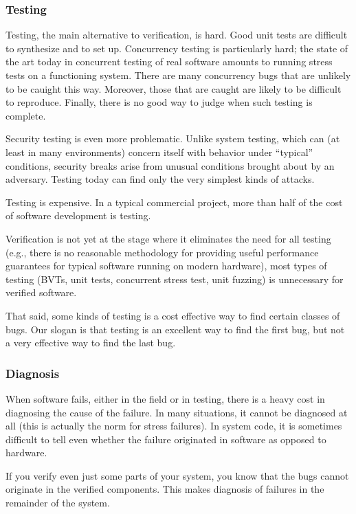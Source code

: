 \documentclass{report}
\begin{document}
\subsubsection{Testing}
Testing, the main alternative to verification, is hard. Good unit
tests are difficult to synthesize and to set up. Concurrency testing
is particularly hard; the state of the art today in concurrent testing
of real software amounts to running stress tests on a functioning
system. There are many concurrency bugs that are unlikely to be
cauight this way. Moreover, those that are caught are likely to be
difficult to reproduce. Finally, there is no good way to judge when
such testing is complete.

Security testing is even more problematic. Unlike system testing,
which can (at least in many environments) concern itself with behavior
under ``typical'' conditions, security breaks arise from unusual
conditions brought about by an adversary. Testing today can find
only the very simplest kinds of attacks. 

Testing is expensive. In a typical commercial project, more than half
of the cost of software development is testing. 

Verification is not yet at the stage where it eliminates the need for
all testing (e.g., there is no reasonable methodology for providing
useful performance guarantees for typical software running on modern
hardware), most types of testing (BVTs, unit tests, concurrent stress
test, unit fuzzing) is unnecessary for verified software.

That said, some kinds of testing is a cost effective way to find
certain classes of bugs. Our slogan is that testing is an excellent
way to find the first bug, but not a very effective way to find the
last bug.

\subsubsection{Diagnosis}
When software fails, either in the field or in testing, there is a
heavy cost in diagnosing the cause of the failure. In many situations,
it cannot be diagnosed at all (this is actually the norm for stress
failures). In system code, it is sometimes difficult to tell even whether the
failure originated in software as opposed to hardware.

If you verify even just some parts of your system, you know that the
bugs cannot originate in the verified components. This makes diagnosis
of failures in the remainder of the system. 
\end{document}
